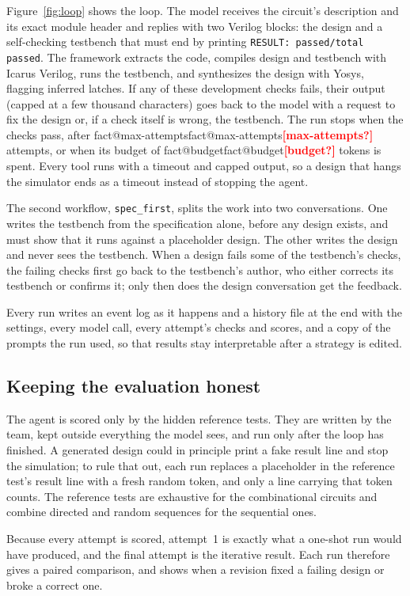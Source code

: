 \documentclass[11pt,a4paper]{article}
\makeatletter
\newcommand{\fact}[1]{\ifcsname fact@#1\endcsname\csname fact@#1\endcsname\else\textcolor{red}{\textbf{[#1?]}}\fi}
\makeatother
\begin{document}
Figure~\ref{fig:loop} shows the loop. The model receives the circuit's description and its exact module header and
replies with two Verilog blocks: the design and a self-checking testbench that must end by printing
\texttt{RESULT: passed/total passed}. The framework extracts the code, compiles design and testbench with Icarus
Verilog, runs the testbench, and synthesizes the design with Yosys, flagging inferred latches. If any of these
development checks fails, their output (capped at a few thousand characters) goes back to the model with a request
to fix the design or, if a check itself is wrong, the testbench. The run stops when the checks pass, after
\fact{max-attempts} attempts, or when its budget of \fact{budget} tokens is spent. Every tool runs with a timeout and
capped output, so a design that hangs the simulator ends as a timeout instead of stopping the agent.

The second workflow, \texttt{spec\_first}, splits the work into two conversations. One writes the testbench from the
specification alone, before any design exists, and must show that it runs against a placeholder design. The other
writes the design and never sees the testbench. When a design fails some of the testbench's checks, the failing
checks first go back to the testbench's author, who either corrects its testbench or confirms it; only then does
the design conversation get the feedback.

Every run writes an event log as it happens and a history file at the end with the settings, every model call,
every attempt's checks and scores, and a copy of the prompts the run used, so that results stay interpretable after
a strategy is edited.

\subsection{Keeping the evaluation honest}

The agent is scored only by the hidden reference tests. They are written by the team, kept outside everything the
model sees, and run only after the loop has finished. A generated design could in principle print a fake result
line and stop the simulation; to rule that out, each run replaces a placeholder in the reference test's result line
with a fresh random token, and only a line carrying that token counts. The reference tests are exhaustive for the
combinational circuits and combine directed and random sequences for the sequential ones.

Because every attempt is scored, attempt~1 is exactly what a one-shot run would have produced, and the final
attempt is the iterative result. Each run therefore gives a paired comparison, and shows when a revision fixed a
failing design or broke a correct one.
\end{document}
